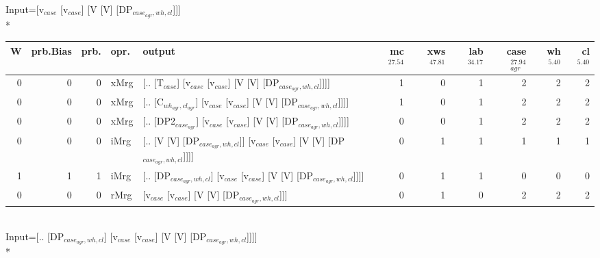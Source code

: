 \begingroup\scriptsize Input=[v$_{case}$ [v$_{case}$] [V [V] [DP$_{case_{agr},wh,cl}$]]]\\*
\begin{tabularx}{\linewidth}{rrrlXrrrrrr}
\hline
   W &   prb.Bias &   prb. & opr.   & output                                                                         &   mc$^{27.54}$ &   xws$^{47.81}$ &   lab$^{34.17}$ &   case$_{agr}^{27.94}$ &   wh$^{5.40}$ &   cl$^{5.40}$ \\
\hline
   0 &       0 &   0 & xMrg & [.. [T$_{case}$] [v$_{case}$ [v$_{case}$] [V [V] [DP$_{case_{agr},wh,cl}$]]]]                    &            1 &             0 &             1 &                  2 &           2 &           2 \\
   0 &       0 &   0 & xMrg & [.. [C$_{wh_{agr},cl_{agr}}$] [v$_{case}$ [v$_{case}$] [V [V] [DP$_{case_{agr},wh,cl}$]]]]           &            1 &             0 &             1 &                  2 &           2 &           2 \\
   0 &       0 &   0 & xMrg & [.. [DP2$_{case_{agr}}$] [v$_{case}$ [v$_{case}$] [V [V] [DP$_{case_{agr},wh,cl}$]]]]              &            0 &             0 &             1 &                  2 &           2 &           2 \\
   0 &       0 &   0 & iMrg & [.. [V [V] [DP$_{case_{agr},wh,cl}$]] [v$_{case}$ [v$_{case}$] [V [V] [DP$_{case_{agr},wh,cl}$]]]] &            0 &             1 &             1 &                  1 &           1 &           1 \\
   1 &       1 &   1 & iMrg & [.. [DP$_{case_{agr},wh,cl}$] [v$_{case}$ [v$_{case}$] [V [V] [DP$_{case_{agr},wh,cl}$]]]]         &            0 &             1 &             1 &                  0 &           0 &           0 \\
   0 &       0 &   0 & rMrg & [v$_{case}$ [v$_{case}$] [V [V] [DP$_{case_{agr},wh,cl}$]]]                                  &            0 &             1 &             0 &                  2 &           2 &           2 \\
\hline
\end{tabularx}\endgroup\\
\begingroup\scriptsize Input=[.. [DP$_{case_{agr},wh,cl}$] [v$_{case}$ [v$_{case}$] [V [V] [DP$_{case_{agr},wh,cl}$]]]]\\*
